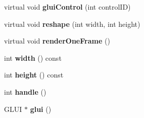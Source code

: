 \begin{DoxyCompactItemize}
\item 
\hypertarget{classBaseGfxApp_a2978a7c358794c67df73b66776b2cef3}{virtual void {\bfseries glui\-Control} (int control\-I\-D)}\label{classBaseGfxApp_a2978a7c358794c67df73b66776b2cef3}

\item 
\hypertarget{classBaseGfxApp_a5d8d5d778a8aecd7f5f8e9c87f4c3d20}{virtual void {\bfseries reshape} (int width, int height)}\label{classBaseGfxApp_a5d8d5d778a8aecd7f5f8e9c87f4c3d20}

\item 
\hypertarget{classBaseGfxApp_ad667534069c50951121968a2027b58e2}{virtual void {\bfseries render\-One\-Frame} ()}\label{classBaseGfxApp_ad667534069c50951121968a2027b58e2}

\item 
\hypertarget{classBaseGfxApp_ace089a1a94fb6bb0bc17e1b7fa48e05d}{int {\bfseries width} () const }\label{classBaseGfxApp_ace089a1a94fb6bb0bc17e1b7fa48e05d}

\item 
\hypertarget{classBaseGfxApp_aa253dbe16a20c40e0a1bf8ff942ceea3}{int {\bfseries height} () const }\label{classBaseGfxApp_aa253dbe16a20c40e0a1bf8ff942ceea3}

\item 
\hypertarget{classBaseGfxApp_ae9779f948eff6f45beec08091e98a803}{int {\bfseries handle} ()}\label{classBaseGfxApp_ae9779f948eff6f45beec08091e98a803}

\item 
\hypertarget{classBaseGfxApp_ac721a0fedce80308c5c0e5695016e95d}{G\-L\-U\-I $\ast$ {\bfseries glui} ()}\label{classBaseGfxApp_ac721a0fedce80308c5c0e5695016e95d}

\end{DoxyCompactItemize}
